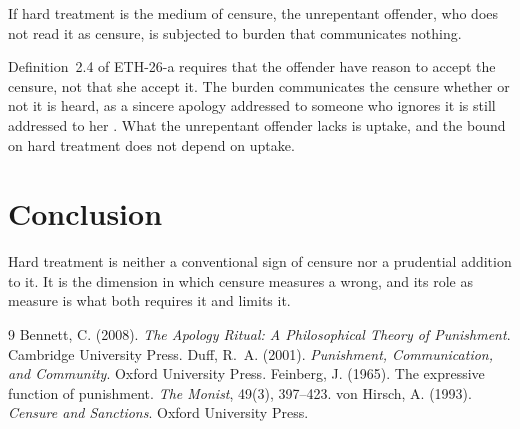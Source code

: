 \documentclass{situationist-preprint}
\begin{document}
\begin{objection}
If hard treatment is the medium of censure, the unrepentant offender, who does not read it as censure, is subjected to burden that communicates nothing.
\end{objection}

\begin{reply}
Definition~2.4 of ETH-26-a requires that the offender have reason to accept the censure, not that she accept it. The burden communicates the censure whether or not it is heard, as a sincere apology addressed to someone who ignores it is still addressed to her \citep{Bennett2008}. What the unrepentant offender lacks is uptake, and the bound on hard treatment does not depend on uptake.
\end{reply}

\section{Conclusion}

Hard treatment is neither a conventional sign of censure nor a prudential addition to it. It is the dimension in which censure measures a wrong, and its role as measure is what both requires it and limits it.

\begin{thebibliography}{9}\small
{} Bennett, C. (2008). \emph{The Apology Ritual: A Philosophical Theory of Punishment}. Cambridge University Press.
 Duff, R.~A. (2001). \emph{Punishment, Communication, and Community}. Oxford University Press.
 Feinberg, J. (1965). The expressive function of punishment. \emph{The Monist}, 49(3), 397--423.
 von Hirsch, A. (1993). \emph{Censure and Sanctions}. Oxford University Press.
\end{thebibliography}
\end{document}
